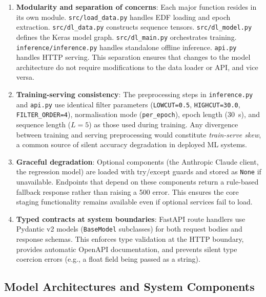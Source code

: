 \documentclass[10pt]{article}
\begin{document}
\begin{enumerate}
  \item \textbf{Modularity and separation of concerns}: Each major function resides in its own module. \texttt{src/load\_data.py} handles EDF loading and epoch extraction. \texttt{src/dl\_data.py} constructs sequence tensors. \texttt{src/dl\_model.py} defines the Keras model graph. \texttt{src/dl\_main.py} orchestrates training. \texttt{inference/inference.py} handles standalone offline inference. \texttt{api.py} handles HTTP serving. This separation ensures that changes to the model architecture do not require modifications to the data loader or API, and vice versa.

  \item \textbf{Training-serving consistency}: The preprocessing steps in \texttt{inference.py} and \texttt{api.py} use identical filter parameters (\texttt{LOWCUT=0.5}, \texttt{HIGHCUT=30.0}, \texttt{FILTER\_ORDER=4}), normalisation mode (\texttt{per\_epoch}), epoch length (30~s), and sequence length ($L=5$) as those used during training. Any divergence between training and serving preprocessing would constitute \textit{train-serve skew}, a common source of silent accuracy degradation in deployed ML systems.

  \item \textbf{Graceful degradation}: Optional components (the Anthropic Claude client, the regression model) are loaded with try/except guards and stored as \texttt{None} if unavailable. Endpoints that depend on these components return a rule-based fallback response rather than raising a 500 error. This ensures the core staging functionality remains available even if optional services fail to load.

  \item \textbf{Typed contracts at system boundaries}: FastAPI route handlers use Pydantic v2 models (\texttt{BaseModel} subclasses) for both request bodies and response schemas. This enforces type validation at the HTTP boundary, provides automatic OpenAPI documentation, and prevents silent type coercion errors (e.g., a float field being passed as a string).
\end{enumerate}

\subsection{Model Architectures and System Components}
\label{sec:modelArchitectures}
\end{document}

